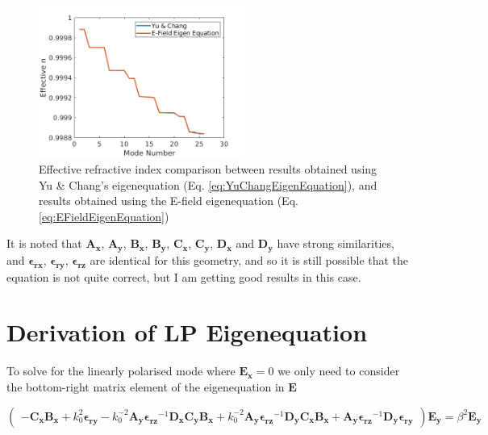 \documentclass[]{article}
\begin{document}
\begin{figure}[htb]
	\centering
	\includegraphics[width=0.6\textwidth]{Figures/YuChang_EFieldEigenEquation}
	\caption{Effective refractive index comparison between results obtained using Yu \& Chang's eigenequation (Eq. \ref{eq:YuChangEigenEquation}), and results obtained using the E-field eigenequation (Eq. \ref{eq:EFieldEigenEquation})}
\end{figure}

It is noted that $\mathbf{A_x}$, $\mathbf{A_y}$, $\mathbf{B_x}$, $\mathbf{B_y}$, $\mathbf{C_x}$, $\mathbf{C_y}$, $\mathbf{D_x}$ and $\mathbf{D_y}$ have strong similarities, and $\mathbf{\epsilon_{rx}}$, $\mathbf{\epsilon_{ry}}$, $\mathbf{\epsilon_{rz}}$ are identical for this geometry, and so it is still possible that the equation is not quite correct, but I am getting good results in this case.

\newpage

\section{Derivation of LP Eigenequation}

To solve for the linearly polarised mode where $\mathbf{E_x} = 0$ we only need to consider the bottom-right matrix element of the eigenequation in $\mathbf{E}$

\begin{equation}
\begin{pmatrix}
-\mathbf{C_x} \mathbf{B_x} + k_0^2  \mathbf{\epsilon_{ry}} - k_0^{-2} \mathbf{A_y} \mathbf{\epsilon_{rz}}^{-1} \mathbf{D_x} \mathbf{C_y} \mathbf{B_x} + k_0^{-2} \mathbf{A_y} \mathbf{\epsilon_{rz}}^{-1} \mathbf{D_y} \mathbf{C_x}\mathbf{B_x} + \mathbf{A_y} \mathbf{\epsilon_{rz}}^{-1} \mathbf{D_y} \mathbf{\epsilon_{ry}} 
\end{pmatrix}
\mathbf{E_y}
=\beta^2
\mathbf{E_y}
\label{eq:LPEigenEquation}
\end{equation}
\end{document}
